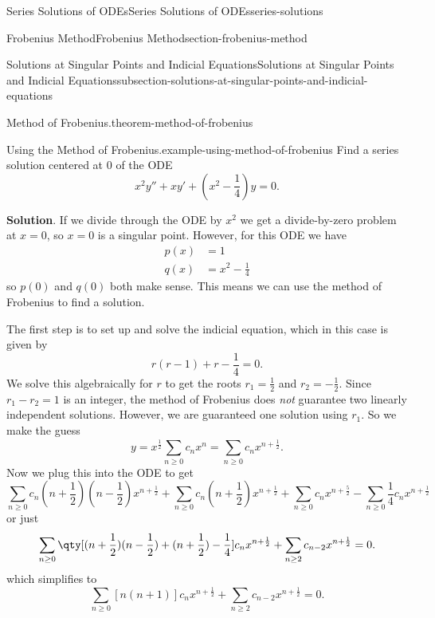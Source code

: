 \documentclass[oneside,10pt,]{book}
\numberwithin{equation}{section}
\newcommand{\brackets}[1]{\left[ #1 \right]}
\newcommand{\amp}{&}
\begin{document}
\begin{chapterptx}{Series Solutions of ODEs}{}{Series Solutions of ODEs}{}{}{series-solutions}
\begin{sectionptx}{Frobenius Method}{}{Frobenius Method}{}{}{section-frobenius-method}
\begin{subsectionptx}{Solutions at Singular Points and Indicial Equations}{}{Solutions at Singular Points and Indicial Equations}{}{}{subsection-solutions-at-singular-points-and-indicial-equations}
\begin{theorem}{Method of Frobenius.}{}{theorem-method-of-frobenius}
\begin{enumerate}
\end{enumerate}
%
\end{theorem}
\begin{example}{Using the Method of Frobenius.}{example-using-method-of-frobenius}%
\hypertarget{p-481}{}%
Find a series solution centered at \(0\) of the ODE%
\begin{equation*}
x^{2}y''+xy'+(x^{2}-\frac{1}{4})y=0.
\end{equation*}
%
\par\smallskip%
\noindent\textbf{Solution}.\hypertarget{solution-75}{}\quad%
\hypertarget{p-482}{}%
If we divide through the ODE by \(x^{2}\) we get a divide-by-zero problem at \(x=0\), so \(x=0\) is a singular point. However, for this ODE we have%
\begin{align*}
p(x) \amp= 1\\
q(x) \amp= x^{2}-\frac{1}{4}
\end{align*}
so \(p(0)\) and \(q(0)\) both make sense. This means we can use the method of Frobenius to find a solution.%
\par
\hypertarget{p-483}{}%
The first step is to set up and solve the indicial equation, which in this case is given by%
\begin{equation*}
r(r-1)+r-\frac{1}{4} = 0.
\end{equation*}
We solve this algebraically for \(r\) to get the roots \(r_{1}=\frac{1}{2}\) and \(r_{2}=-\frac{1}{2}\). Since \(r_{1}-r_{2} = 1\) is an integer, the method of Frobenius does \emph{not} guarantee two linearly independent solutions. However, we are guaranteed one solution using \(r_{1}\). So we make the guess%
\begin{equation*}
y = x^{\frac{1}{2}}\sum_{n\geq0}^{}c_{n}x^{n} = \sum_{n\geq0}^{}c_{n}x^{n+\frac{1}{2}}.
\end{equation*}
Now we plug this into the ODE to get%
\begin{equation*}
\sum_{n\geq0}c_{n}(n+\frac{1}{2})(n-\frac{1}{2})x^{n+\frac{1}{2}} + \sum_{n\geq0}c_{n}(n+\frac{1}{2})x^{n+\frac{1}{2}} 
+ \sum_{n\geq0}c_{n}x^{n+\frac{5}{2}} - \sum_{n\geq0}\frac{1}{4}c_{n}x^{n+\frac{1}{2}}
\end{equation*}
or just%
\begin{equation*}
\sum_{n\geq0}^{}\qty[(n+\frac{1}{2})(n-\frac{1}{2})+(n+\frac{1}{2})-\frac{1}{4}]c_{n}x^{n+\frac{1}{2}} 
+\sum_{n\geq2}^{}c_{n-2}x^{n+\frac{1}{2}}=0.
\end{equation*}
which simplifies to%
\begin{equation*}
\sum_{n\geq0}\brackets{n(n+1)}c_{n}x^{n+\frac{1}{2}}+\sum_{n\geq2}c_{n-2}x^{n+\frac{1}{2}} = 0.

\end{equation*}
\end{example}
\end{subsectionptx}
\end{sectionptx}
\end{chapterptx}
\end{document}
